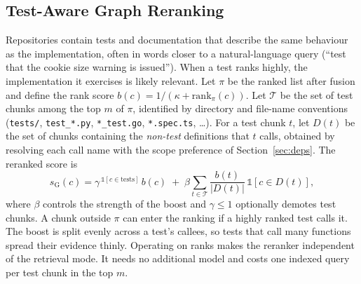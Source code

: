 \documentclass[conference]{IEEEtran}
\begin{document}
\subsection{Test-Aware Graph Reranking}\label{sec:graphrr}
Repositories contain tests and documentation that describe the same behaviour
as the implementation, often in words closer to a natural-language query
(``test that the cookie size warning is issued''). When a test ranks highly, the
implementation it exercises is likely relevant. Let $\pi$ be the ranked list
after fusion and define the rank score $b(c) = 1/(\kappa + \text{rank}_\pi(c))$.
Let $\mathcal{T}$ be the set of test chunks among the top $m$ of $\pi$,
identified by directory and file-name conventions (\texttt{tests/},
\texttt{test\_*.py}, \texttt{*\_test.go}, \texttt{*.spec.ts}, \ldots). For a test
chunk $t$, let $D(t)$ be the set of chunks containing the \emph{non-test}
definitions that $t$ calls, obtained by resolving each call name with the scope
preference of Section~\ref{sec:deps}. The reranked score is
\begin{equation}
  s_{\text{G}}(c) = \gamma^{\,\mathbb{1}[c \in \text{tests}]}\, b(c)
  \;+\; \beta \sum_{t \in \mathcal{T}} \frac{b(t)}{|D(t)|}\,\mathbb{1}[c \in D(t)],
\end{equation}
where $\beta$ controls the strength of the boost and $\gamma \le 1$ optionally
demotes test chunks. A chunk outside $\pi$ can enter the ranking if a highly
ranked test calls it. The boost is split evenly across a test's callees, so
tests that call many functions spread their evidence thinly. Operating on ranks
makes the reranker independent of the retrieval mode. It needs no additional
model and costs one indexed query per test chunk in the top $m$.
\end{document}
